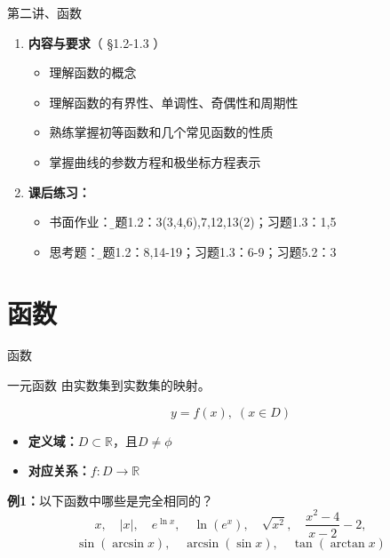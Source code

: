 \begin{frame}{第二讲、函数}
	\linespread{1.5}
	\begin{enumerate}
	  \item {\bf 内容与要求}{\color{blue}（ \S 1.2-1.3 ）}
	  \begin{itemize}
	    \item 理解函数的概念
	    \item 理解函数的有界性、单调性、奇偶性和周期性
	    \item 熟练掌握初等函数和几个常见函数的性质
	    \item 掌握曲线的参数方程和极坐标方程表示
	  \vspace{1em}
	  \end{itemize}
	  \item {\bf 课后练习：}
	  \begin{itemize}
	    \item 书面作业：{\b 习题1.2：3(3,4,6),7,12,13(2)；习题1.3：1,5}
	    \item 思考题：{\b 习题1.2：8,14-19；习题1.3：6-9；习题5.2：3}
	  \end{itemize}
	\end{enumerate}
\end{frame}

\section{函数}

\begin{frame}{函数}
	\linespread{1.2}\pause 
	\begin{block}{一元函数}\pause 
		由实数集到实数集的映射。
	\end{block}
	\vspace{-1em}\pause 
	$$y=f(x),\;(x\in D)$$
	\vspace{-1em}\pause 
	\begin{itemize}
	  \item {\bf 定义域：}\pause $D\subset \mathbb{R}$\pause ，且$D\ne\phi$\pause 
	  \item {\bf 对应关系：}\pause $f:D\to\mathbb{R}$
	\end{itemize}\pause 
	\begin{exampleblock}{{\bf 例1：}以下函数中哪些是完全相同的？}
		$$x,\quad |x|,\quad e^{\ln x},\quad \ln(e^x),\quad \sqrt{x^2},\quad
		\frac{x^2-4}{x-2}-2,$$
		$$\sin(\arcsin x),\quad \arcsin(\sin x), \quad \tan(\arctan x)$$
	\end{exampleblock}
\end{frame}


